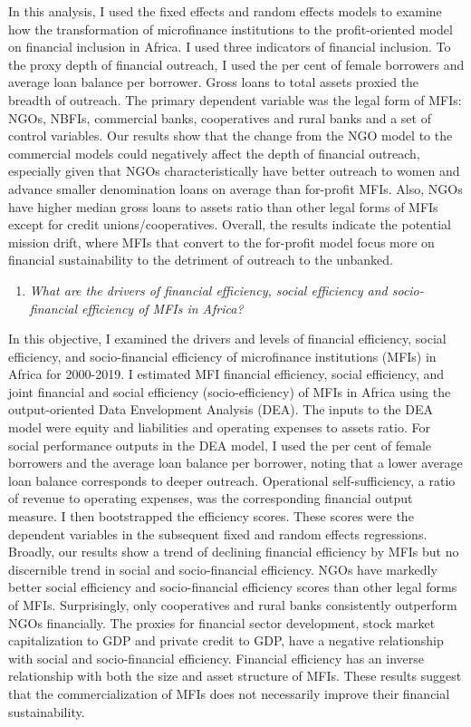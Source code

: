 \documentclass[a4paper, nobind]{templates/ociamthesis}
\providecommand{\tightlist}{%
  \setlength{\itemsep}{0pt}\setlength{\parskip}{0pt}}
\begin{document}
In this analysis, I used the fixed effects and random effects models to examine how the transformation of microfinance institutions to the profit-oriented model on financial inclusion in Africa. I used three indicators of financial inclusion. To the proxy depth of financial outreach, I used the per cent of female borrowers and average loan balance per borrower. Gross loans to total assets proxied the breadth of outreach. The primary dependent variable was the legal form of MFIs: NGOs, NBFIs, commercial banks, cooperatives and rural banks and a set of control variables. Our results show that the change from the NGO model to the commercial models could negatively affect the depth of financial outreach, especially given that NGOs characteristically have better outreach to women and advance smaller denomination loans on average than for-profit MFIs. Also, NGOs have higher median gross loans to assets ratio than other legal forms of MFIs except for credit unions/cooperatives. Overall, the results indicate the potential mission drift, where MFIs that convert to the for-profit model focus more on financial sustainability to the detriment of outreach to the unbanked.

\begin{enumerate}
\def\labelenumi{\arabic{enumi}.}
\setcounter{enumi}{2}
\tightlist
\item
  \emph{What are the drivers of financial efficiency, social efficiency and socio-financial efficiency of MFIs in Africa?}
\end{enumerate}

In this objective, I examined the drivers and levels of financial efficiency, social efficiency, and socio-financial efficiency of microfinance institutions (MFIs) in Africa for 2000-2019. I estimated MFI financial efficiency, social efficiency, and joint financial and social efficiency (socio-efficiency) of MFIs in Africa using the output-oriented Data Envelopment Analysis (DEA). The inputs to the DEA model were equity and liabilities and operating expenses to assets ratio. For social performance outputs in the DEA model, I used the per cent of female borrowers and the average loan balance per borrower, noting that a lower average loan balance corresponds to deeper outreach. Operational self-sufficiency, a ratio of revenue to operating expenses, was the corresponding financial output measure. I then bootstrapped the efficiency scores. These scores were the dependent variables in the subsequent fixed and random effects regressions. Broadly, our results show a trend of declining financial efficiency by MFIs but no discernible trend in social and socio-financial efficiency. NGOs have markedly better social efficiency and socio-financial efficiency scores than other legal forms of MFIs. Surprisingly, only cooperatives and rural banks consistently outperform NGOs financially. The proxies for financial sector development, stock market capitalization to GDP and private credit to GDP, have a negative relationship with social and socio-financial efficiency. Financial efficiency has an inverse relationship with both the size and asset structure of MFIs. These results suggest that the commercialization of MFIs does not necessarily improve their financial sustainability.
\end{document}
